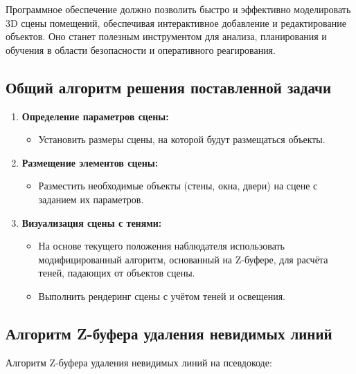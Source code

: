 \hspace{1.25cm}
Программное обеспечение должно позволить быстро и эффективно моделировать 3D сцены помещений, обеспечивая интерактивное добавление и редактирование объектов. Оно станет полезным инструментом для анализа, планирования и обучения в области безопасности и оперативного реагирования.


\subsection{Общий алгоритм решения поставленной задачи}

\begin{enumerate}
    \item \textbf{Определение параметров сцены:}
    \begin{itemize}
        \item Установить размеры сцены, на которой будут размещаться объекты.
    \end{itemize}
    
    \item \textbf{Размещение элементов сцены:}
    \begin{itemize}
        \item Разместить необходимые объекты (стены, окна, двери) на сцене с заданием их параметров.
    \end{itemize}
    
    \item \textbf{Визуализация сцены с тенями:}
    \begin{itemize}
        \item На основе текущего положения наблюдателя использовать модифицированный алгоритм, основанный на Z-буфере, для расчёта теней, падающих от объектов сцены.
        \item Выполнить рендеринг сцены с учётом теней и освещения.
    \end{itemize}
\end{enumerate}


\subsection{Алгоритм Z-буфера удаления невидимых линий}
\label{subsection:algo_Zbuff}

\hspace{1.25cm}
Алгоритм Z-буфера удаления невидимых линий на псевдокоде:

